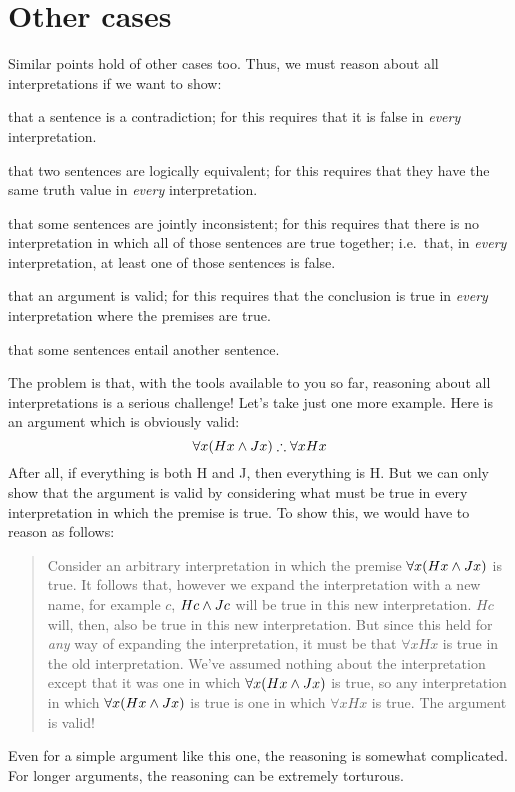 \section{Other cases}
Similar points hold of other cases too. Thus, we must reason about all interpretations if we want to show:
	\begin{ebullet}
		\item that a sentence is a contradiction; for this requires that it is false in \emph{every} interpretation.
		\item that two sentences are logically equivalent; for this requires that they have the same truth value in \emph{every} interpretation.
		\item that some sentences are jointly inconsistent; for this requires that there is no interpretation in which all of those sentences are true together; i.e.\ that, in \emph{every} interpretation, at  least one of those sentences is false.
		\item that an argument is valid; for this requires that the conclusion is true in \emph{every} interpretation where the premises are true.
		\item that some sentences entail another sentence.
	\end{ebullet}
The problem is that, with the tools available to you so far, reasoning about all interpretations is a serious challenge! Let's take just one more example. Here is an argument which is obviously valid:
	$$\forall x(Hx \eand Jx) \therefore \forall x Hx$$
After all, if everything is both H and J, then everything is H. But we can only show that the argument is valid by considering what must be true in every interpretation in which the premise is true. To show this, we would have to reason as follows:
	\begin{quote}
		Consider an arbitrary interpretation in which the premise $\forall x(Hx \mathbin{\wedge} Jx)$ is true. It follows that, however we expand the interpretation with a new name, for example $c$, $Hc \mathbin{\wedge} Jc$ will be true in this new interpretation. $Hc$ will, then, also be true in this new interpretation. But since this held for \emph{any} way of expanding the interpretation, it must be that $\forall x Hx$ is true in the old interpretation. We've assumed nothing about the interpretation except that it was one in which $\forall x(Hx \mathbin{\wedge} Jx)$  is true, so any interpretation in which $\forall x(Hx \mathbin{\wedge} Jx)$ is true is one in which $\forall x Hx$ is true. The argument is valid!
\end{quote}
Even for a simple argument like this one, the reasoning is somewhat complicated. For longer arguments, the reasoning can be extremely torturous.

